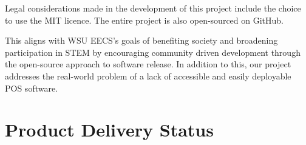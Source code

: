 
Legal considerations made in the development of this project include the choice
to use the MIT licence. The entire project is also open-sourced on GitHub.\par

This aligns with WSU EECS's goals of benefiting society and broadening participation
in STEM by encouraging community driven development through the open-source approach
to software release. In addition to this, our project addresses the real-world problem of a lack of accessible and easily
deployable POS software.

\section{Product Delivery Status}





